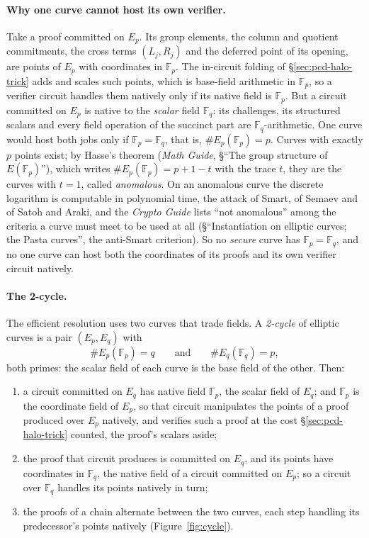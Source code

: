 \documentclass[11pt,a4paper]{article}
\theoremstyle{definition}
\newcommand{\F}{\mathbb{F}}
\begin{document}
\paragraph{Why one curve cannot host its own verifier.}
Take a proof committed on $E_p$. Its group elements, the column and
quotient commitments, the cross terms $(L_j, R_j)$ and the deferred
point of its opening, are points of $E_p$ with coordinates in $\F_p$. The
in-circuit folding of \S\ref{sec:pcd-halo-trick} adds and scales such
points, which is base-field arithmetic in $\F_p$, so a verifier circuit
handles them natively only if its native field is $\F_p$. But a circuit
committed on $E_p$ is native to the \emph{scalar} field $\F_q$: its
challenges, its structured scalars and every field operation of the
succinct part are $\F_q$-arithmetic. One curve would host both jobs
only if $\F_p = \F_q$, that is, $\#E_p(\F_p) = p$. Curves with exactly
$p$ points exist; by Hasse's theorem (\emph{Math Guide}, \S``The group
structure of $E(\F_p)$''), which writes $\#E_p(\F_p) = p + 1 - t$ with
the trace $t$, they are the curves with $t = 1$, called
\emph{anomalous}. On an anomalous curve the discrete logarithm is
computable in polynomial time, the attack of Smart, of Semaev and of
Satoh and Araki, and the \emph{Crypto Guide} lists ``not anomalous''
among the criteria a curve must meet to be used at all
(\S``Instantiation on elliptic curves; the Pasta curves'', the
anti-Smart criterion). So no \emph{secure} curve has $\F_p = \F_q$, and
no one curve can host both the coordinates of its proofs and its own
verifier circuit natively.

\paragraph{The 2-cycle.}
The efficient resolution uses two curves that trade fields. A
\emph{2-cycle} of elliptic curves is a pair $(E_p, E_q)$ with
\[
\#E_p(\F_p) = q \qquad\text{and}\qquad \#E_q(\F_q) = p ,
\]
both primes: the scalar field of each curve is the base field of the
other. Then:
\begin{enumerate}[leftmargin=*, itemsep=2pt]
\item a circuit committed on $E_q$ has native field $\F_p$, the scalar
  field of $E_q$; and $\F_p$ is the coordinate field of $E_p$, so that
  circuit manipulates the points of a proof produced over $E_p$
  natively, and verifies such a proof at the cost
  \S\ref{sec:pcd-halo-trick} counted, the proof's scalars aside;
\item the proof that circuit produces is committed on $E_q$, and its
  points have coordinates in $\F_q$, the native field of a circuit
  committed on $E_p$; so a circuit over $\F_q$ handles its points
  natively in turn;
\item the proofs of a chain alternate between the two curves, each step
  handling its predecessor's points natively (Figure~\ref{fig:cycle}).
\end{enumerate}
\end{document}
